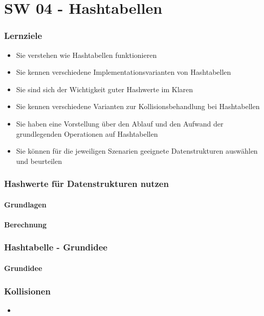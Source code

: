 \part{SW 04 - Hashtabellen}
\section{Lernziele}
\begin{itemize}
    \item Sie verstehen wie Hashtabellen funktionieren
    \item Sie kennen verschiedene Implementationsvarianten von Hashtabellen
    \item Sie sind sich der Wichtigkeit guter Hashwerte im Klaren
    \item Sie kennen verschiedene Varianten zur Kollisionsbehandlung bei Hashtabellen
    \item Sie haben eine Vorstellung über den Ablauf und den Aufwand der grundlegenden Operationen auf Hashtabellen
    \item Sie können für die jeweiligen Szenarien geeignete Datenstrukturen auswählen und beurteilen
\end{itemize}

\section{Hashwerte für Datenstrukturen nutzen}
\subsection{Grundlagen}
\subsection{Berechnung}

\section{Hashtabelle - Grundidee}
\subsection{Grundidee}

\section{Kollisionen}
\begin{itemize}
    \item
\end{itemize}
